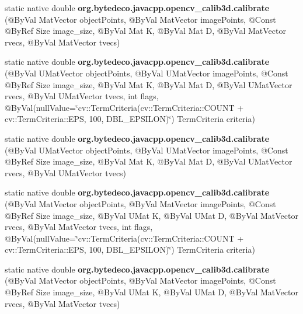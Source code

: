 \begin{DoxyCompactItemize}
static native double {\bfseries org.\+bytedeco.\+javacpp.\+opencv\+\_\+calib3d.\+calibrate} (@By\+Val Mat\+Vector object\+Points, @By\+Val Mat\+Vector image\+Points, @Const @By\+Ref Size image\+\_\+size, @By\+Val Mat K, @By\+Val Mat D, @By\+Val Mat\+Vector rvecs, @By\+Val Mat\+Vector tvecs)
\item 
\mbox{\label{group__calib3d__fisheye_ga6347d2944f3553c991abe41224c42370}} 
static native double {\bfseries org.\+bytedeco.\+javacpp.\+opencv\+\_\+calib3d.\+calibrate} (@By\+Val U\+Mat\+Vector object\+Points, @By\+Val U\+Mat\+Vector image\+Points, @Const @By\+Ref Size image\+\_\+size, @By\+Val Mat K, @By\+Val Mat D, @By\+Val U\+Mat\+Vector rvecs, @By\+Val U\+Mat\+Vector tvecs, int flags, @By\+Val(null\+Value=\char`\"{}cv\+::\+Term\+Criteria(cv\+::\+Term\+Criteria\+::\+C\+O\+U\+NT + cv\+::\+Term\+Criteria\+::\+E\+PS, 100, D\+B\+L\+\_\+\+E\+P\+S\+I\+L\+ON)\char`\"{}) Term\+Criteria criteria)
\item 
\mbox{\label{group__calib3d__fisheye_gae2ede7ac50b49d473824777a6d1d068d}} 
static native double {\bfseries org.\+bytedeco.\+javacpp.\+opencv\+\_\+calib3d.\+calibrate} (@By\+Val U\+Mat\+Vector object\+Points, @By\+Val U\+Mat\+Vector image\+Points, @Const @By\+Ref Size image\+\_\+size, @By\+Val Mat K, @By\+Val Mat D, @By\+Val U\+Mat\+Vector rvecs, @By\+Val U\+Mat\+Vector tvecs)
\item 
\mbox{\label{group__calib3d__fisheye_ga6b6a7b50da7d44d995abbb18cbed5e63}} 
static native double {\bfseries org.\+bytedeco.\+javacpp.\+opencv\+\_\+calib3d.\+calibrate} (@By\+Val Mat\+Vector object\+Points, @By\+Val Mat\+Vector image\+Points, @Const @By\+Ref Size image\+\_\+size, @By\+Val U\+Mat K, @By\+Val U\+Mat D, @By\+Val Mat\+Vector rvecs, @By\+Val Mat\+Vector tvecs, int flags, @By\+Val(null\+Value=\char`\"{}cv\+::\+Term\+Criteria(cv\+::\+Term\+Criteria\+::\+C\+O\+U\+NT + cv\+::\+Term\+Criteria\+::\+E\+PS, 100, D\+B\+L\+\_\+\+E\+P\+S\+I\+L\+ON)\char`\"{}) Term\+Criteria criteria)
\item 
\mbox{\label{group__calib3d__fisheye_ga8a7d83f4efa45ff68083ecfe4e9764f8}} 
static native double {\bfseries org.\+bytedeco.\+javacpp.\+opencv\+\_\+calib3d.\+calibrate} (@By\+Val Mat\+Vector object\+Points, @By\+Val Mat\+Vector image\+Points, @Const @By\+Ref Size image\+\_\+size, @By\+Val U\+Mat K, @By\+Val U\+Mat D, @By\+Val Mat\+Vector rvecs, @By\+Val Mat\+Vector tvecs)

\end{DoxyCompactItemize}

